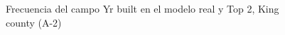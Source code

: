 \begin{figure}[H]
    \centering
    
    \caption{Frecuencia del campo Yr built en el modelo real y Top 2, King county (A-2)}
    \label{frecuency-top2-yr built}
\end{figure}